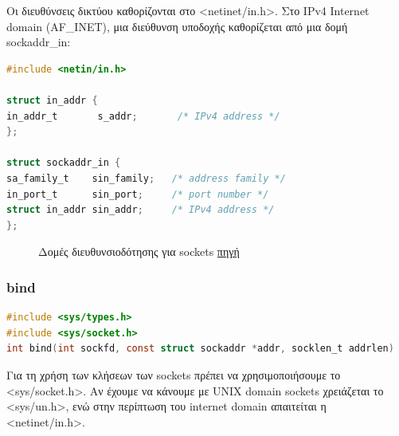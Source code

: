 Οι διευθύνσεις δικτύου καθορίζονται στο <netinet/in.h>. Στο IPv4 Internet domain (AF\_INET), μια διεύθυνση υποδοχής καθορίζεται από μια δομή
sockaddr\_in:

\begin{lstlisting}[float, language=C,breaklines=true, frame=none, backgroundcolor=\color{lightgray}, basicstyle=\footnotesize\ttfamily]
#include <netin/in.h>

struct in_addr {
in_addr_t       s_addr;       /* IPv4 address */
};

struct sockaddr_in {
sa_family_t    sin_family;   /* address family */
in_port_t      sin_port;     /* port number */
struct in_addr sin_addr;     /* IPv4 address */
};
\end{lstlisting}

\begin{figure} 
	\centering	{}
	\caption{Δομές διευθυνσιοδότησης για sockets \href{http://www.ico.aha.ru/h/The\_Design\_and\_Implementation\_of\_the\_FreeBSD\_Operating\_System/ch11lev1sec4.htm}{πηγή}}
	\label{sock_struct}
\end{figure} 




\subsubsection*{bind}
\begin{lstlisting}[language=C,breaklines=true, frame=none, backgroundcolor=\color{lightgray}, basicstyle=\footnotesize\ttfamily]
#include <sys/types.h>          
#include <sys/socket.h>
int bind(int sockfd, const struct sockaddr *addr, socklen_t addrlen)
\end{lstlisting}

Για τη χρήση των κλήσεων των sockets πρέπει να χρησιμοποιήσουμε το   <sys/socket.h>. Αν έχουμε να κάνουμε με UNIX domain sockets χρειάζεται το  <sys/un.h>, ενώ στην περίπτωση του internet domain απαιτείται η <netinet/in.h>. 

